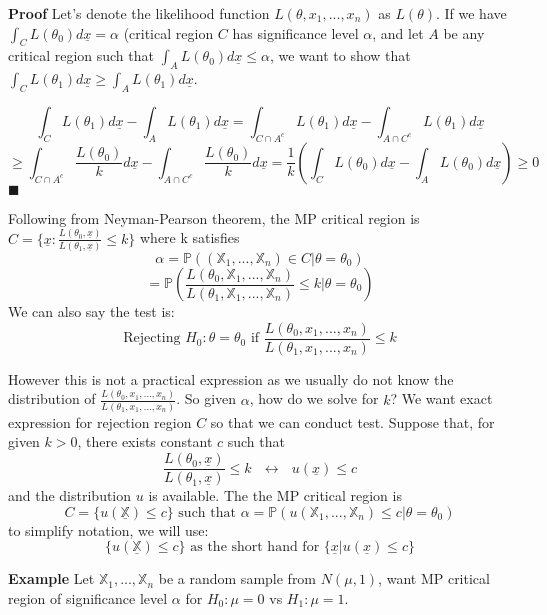 \textbf{Proof} Let's denote the likelihood function $L(\theta, x_1, ..., x_n) $ as $L(\theta)$. If we have $\int_{C} L(\theta_0) d\underline{x} = \alpha$ (critical region $C$ has significance level $\alpha$, and let $A$ be any critical region such that $\int_{A} L(\theta_0) d\underline{x} \leq \alpha$, we want to show that $\int_C L(\theta_1) d\underline{x} \geq \int_A L(\theta_1) d\underline{x}$.

$$\int_C L(\theta_1) d\underline{x} - \int_A L(\theta_1) d\underline{x}
= \int_{C\cap A^c} L(\theta_1) d\underline{x} - \int_{A \cap C^c} L(\theta_1) d\underline{x}$$
$$\geq \int_{C\cap A^c} \frac{L(\theta_0)}{k} d\underline{x} - \int_{A\cap C^c} \frac{L(\theta_0)}{k} d\underline{x}
= \frac{1}{k} ( \int_C L(\theta_0) d\underline{x} - \int_{A} L(\theta_0) d\underline{x} ) \geq 0 $$
$\blacksquare$

Following from Neyman-Pearson theorem, the MP critical region is $C = \{ \underline{x}: \frac{L(\theta_0, \underline{x})}{L(\theta_1, \underline{x})} \leq k\}$ where k satisfies 
$$\alpha = \mathbb{P}((\mathbb{X}_1, ..., \mathbb{X}_n)\in C | \theta = \theta_0)$$
$$= \mathbb{P}( \frac{L(\theta_0, \mathbb{X}_1, ..., \mathbb{X}_n)}{L(\theta_1, \mathbb{X}_1, ..., \mathbb{X}_n)} \leq k | \theta = \theta_0 )$$
We can also say the test is:
$$\text{Rejecting } H_0: \theta = \theta_0 \text{ if } \frac{L(\theta_0, x_1, ..., x_n)}{L(\theta_1, x_1, ..., x_n)} \leq k $$

However this is not a practical expression as we usually do not know the distribution of $\frac{L(\theta_0, x_1, ..., x_n)}{L(\theta_1, x_1, ..., x_n)}$. So given $\alpha$, how do we solve for $k$? We want exact expression for rejection region $C$ so that we can conduct test. Suppose that, for given $k > 0$, there exists constant $c$ such that
$$\frac{L(\theta_0, \underline{x})}{L(\theta_1, \underline{x})} \leq k \ \ \ \leftrightarrow \ \ \ u(\underline{x}) \leq c $$
and the distribution $u$ is available. The the MP critical region is 
$$C = \{u(\underline{\mathbb{X}}) \leq c \} \text{ such that } \alpha = \mathbb{P}(u(\mathbb{X}_1, ..., \mathbb{X}_n)\leq c | \theta = \theta_0)$$
to simplify notation, we will use:
$$\{u(\underline{\mathbb{X}}) \leq c \} \text{ as the short hand for } \{\underline{x} | u(\underline{x}) \leq c \} $$

\textbf{Example} Let $\mathbb{X}_1, ..., \mathbb{X}_n$ be a random sample from $N(\mu, 1)$, want MP critical region of significance level $\alpha$ for $H_0: \mu = 0$ vs $H_1: \mu=1$.

